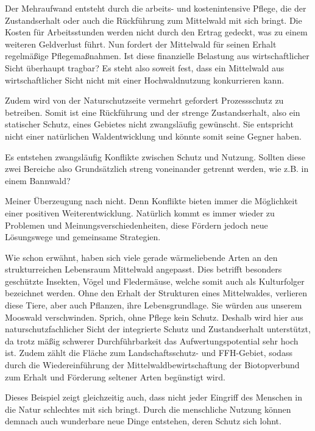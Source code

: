 \documentclass[12pt]{article}
\begin{document}
Der Mehraufwand entsteht durch die arbeits- und kostenintensive Pflege, die der Zustandserhalt oder auch
die Rückführung zum Mittelwald mit sich bringt. Die Kosten für Arbeitsstunden werden nicht durch
den Ertrag gedeckt, was zu einem weiteren Geldverlust führt. Nun fordert der Mittelwald für seinen
Erhalt regelmäßige Pflegemaßnahmen. Ist diese finanzielle Belastung aus wirtschaftlicher Sicht überhaupt tragbar?
Es steht also soweit fest, dass ein Mittelwald aus wirtschaftlicher Sicht nicht 
mit einer Hochwaldnutzung konkurrieren kann.

Zudem wird von der Naturschutzseite vermehrt gefordert Prozessschutz zu betreiben. Somit ist eine
Rückführung und der strenge Zustandserhalt, also ein statischer Schutz, eines Gebietes nicht 
zwangsläufig gewünscht. Sie entspricht nicht einer natürlichen Waldentwicklung und könnte somit 
seine Gegner haben.

Es entstehen zwangsläufig Konflikte zwischen Schutz und Nutzung. Sollten diese zwei Bereiche also
Grundsätzlich streng voneinander getrennt werden, wie z.B. in einem Bannwald?

Meiner Überzeugung nach nicht. Denn Konflikte bieten immer die Möglichkeit einer positiven 
Weiterentwicklung. Natürlich kommt es immer wieder zu Problemen und Meinungsverschiedenheiten,
diese Fördern jedoch neue Lösungswege und gemeinsame Strategien.

Wie schon erwähnt, haben sich viele gerade wärmeliebende Arten an den strukturreichen Lebensraum Mittelwald angepasst.
Dies betrifft besonders geschützte Insekten, Vögel und Fledermäuse, welche somit auch als Kulturfolger
bezeichnet werden. Ohne den Erhalt der Strukturen eines Mittelwaldes, verlieren diese Tiere, aber auch
Pflanzen, ihre Lebensgrundlage. Sie würden aus unserem Mooswald verschwinden. Sprich, ohne Pflege kein
Schutz. Deshalb wird hier aus naturschutzfachlicher Sicht der integrierte Schutz und Zustandserhalt 
unterstützt, da trotz mäßig schwerer Durchführbarkeit das Aufwertungspotential sehr hoch ist. 
Zudem zählt die Fläche zum Landschaftsschutz- und FFH-Gebiet, sodass durch die Wiedereinführung der 
Mittelwaldbewirtschaftung der Biotopverbund zum Erhalt und Förderung seltener Arten begünstigt wird.

Dieses Beispiel zeigt gleichzeitig auch, dass nicht jeder Eingriff des Menschen 
in die Natur schlechtes mit sich bringt. Durch die menschliche Nutzung können demnach auch wunderbare
neue Dinge entstehen, deren Schutz sich lohnt.
\end{document}
